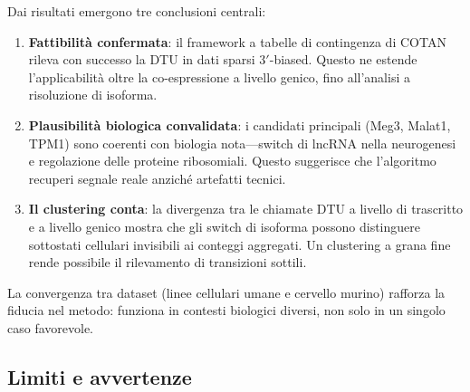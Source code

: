 Dai risultati emergono tre conclusioni centrali:
\begin{enumerate}
    \item \textbf{Fattibilità confermata}: il framework a tabelle di contingenza di COTAN rileva con successo la DTU in dati sparsi $3'$-biased. Questo ne estende l'applicabilità oltre la co-espressione a livello genico, fino all'analisi a risoluzione di isoforma.

    \item \textbf{Plausibilità biologica convalidata}: i candidati principali (Meg3, Malat1, TPM1) sono coerenti con biologia nota---switch di lncRNA nella neurogenesi e regolazione delle proteine ribosomiali. Questo suggerisce che l'algoritmo recuperi segnale reale anziché artefatti tecnici.

    \item \textbf{Il clustering conta}: la divergenza tra le chiamate DTU a livello di trascritto e a livello genico mostra che gli switch di isoforma possono distinguere sottostati cellulari invisibili ai conteggi aggregati. Un clustering a grana fine rende possibile il rilevamento di transizioni sottili.
\end{enumerate}

La convergenza tra dataset (linee cellulari umane e cervello murino) rafforza la fiducia nel metodo: funziona in contesti biologici diversi, non solo in un singolo caso favorevole.

\subsection*{Limiti e avvertenze}

